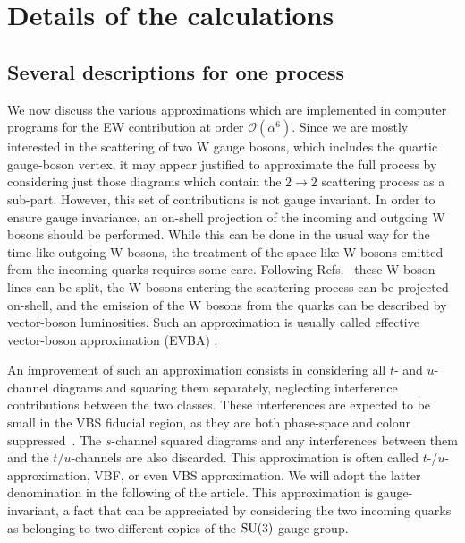 \documentclass[twocolumn,epjc3]{svjour3} %
\newcommand{\PW}{\ensuremath{\text{W}}\xspace}
\begin{document}
\section{Details of the calculations}
    \label{sec:details}
    \subsection{Several descriptions for one process}
    We now discuss the various approximations which are implemented in computer programs for the EW contribution at order $\mathcal{O}{\left(\alpha^{6}\right)}$.
    Since we are mostly interested in 
    the scattering of two $\PW$ gauge bosons, which includes the quartic gauge-boson vertex, it may appear justified to approximate the 
    full process by considering just those diagrams which contain the $2\rightarrow 2$ scattering process as a sub-part.
    However, this set of contributions is not gauge invariant.
    In order to ensure gauge invariance, an on-shell projection of
    the incoming and outgoing W bosons should be performed.
    While this can be done in the usual way for the time-like
    outgoing W bosons, the treatment of the space-like W bosons
    emitted from the incoming quarks requires some care.
    Following Refs.~\cite{Kuss:1995yv,Accomando:2006hq} these W-boson lines can be split,
    the W bosons entering the scattering process can be projected
    on-shell, and the emission of the W bosons from the quarks can be
    described by vector-boson luminosities.
    Such an approximation is usually called effective vector-boson
    approximation (EVBA) \cite{Dawson:1984gx,Duncan:1985vj,Cahn:1983ip}.

    An improvement of such an approximation consists 
    in considering all $t$- and $u$-channel diagrams and squaring them separately, neglecting interference contributions between the two classes.
    These interferences are expected to be small in the VBS fiducial region, as they are both phase-space and colour suppressed~\cite{Oleari:2003tc,Denner:2012dz}.
    The $s$-channel squared diagrams and any interferences between them and the  $t/u$-channels are also discarded.
    This approximation is often called $t$-/$u$- approximation, VBF, or even VBS approximation.
    We will adopt the latter denomination in the following of the article.
    This approximation is gauge-invariant, a fact that can be appreciated by considering the two incoming quarks as belonging to two different copies of the $\rm{SU}(3)$ gauge group.
\end{document}
